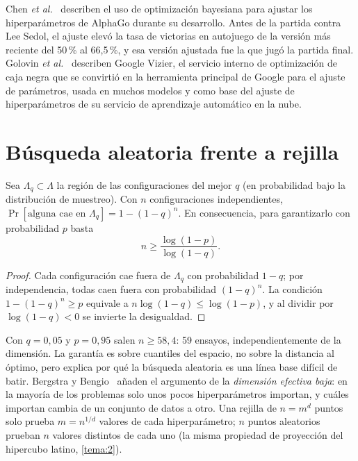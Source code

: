\begin{ejemplo}\label{ej:alphago}
Chen \emph{et al.}~\cite{alphago} describen el uso de optimización bayesiana para ajustar los hiperparámetros de AlphaGo durante su desarrollo. Antes de la partida contra Lee Sedol, el ajuste elevó la tasa de victorias en autojuego de la versión más reciente del 50\,\% al 66,5\,\%, y esa versión ajustada fue la que jugó la partida final. Golovin \emph{et al.}~\cite{vizier} describen Google Vizier, el servicio interno de optimización de caja negra que se convirtió en la herramienta principal de Google para el ajuste de parámetros, usada en muchos modelos y como base del ajuste de hiperparámetros de su servicio de aprendizaje automático en la nube.
\end{ejemplo}

\section{Búsqueda aleatoria frente a rejilla}

\begin{proposicion}\label{prop:aleatoria}
Sea $\Lambda_q\subset\Lambda$ la región de las configuraciones del mejor $q$ (en probabilidad bajo la distribución de muestreo). Con $n$ configuraciones independientes, $\Pr[\text{alguna cae en }\Lambda_q]=1-(1-q)^n$. En consecuencia, para garantizarlo con probabilidad $p$ basta
\[
n\ge\frac{\log(1-p)}{\log(1-q)} .
\]
\end{proposicion}

\begin{proof}
Cada configuración cae fuera de $\Lambda_q$ con probabilidad $1-q$; por independencia, todas caen fuera con probabilidad $(1-q)^n$. La condición $1-(1-q)^n\ge p$ equivale a $n\log(1-q)\le\log(1-p)$, y al dividir por $\log(1-q)<0$ se invierte la desigualdad.
\end{proof}

Con $q=0{,}05$ y $p=0{,}95$ salen $n\ge 58{,}4$: 59 ensayos, independientemente de la dimensión. La garantía es sobre cuantiles del espacio, no sobre la distancia al óptimo, pero explica por qué la búsqueda aleatoria es una línea base difícil de batir. Bergstra y Bengio~\cite{bergstra12} añaden el argumento de la \emph{dimensión efectiva baja}: en la mayoría de los problemas solo unos pocos hiperparámetros importan, y cuáles importan cambia de un conjunto de datos a otro. Una rejilla de $n=m^d$ puntos solo prueba $m=n^{1/d}$ valores de cada hiperparámetro; $n$ puntos aleatorios prueban $n$ valores distintos de cada uno (la misma propiedad de proyección del hipercubo latino, \cref{tema:2}).

